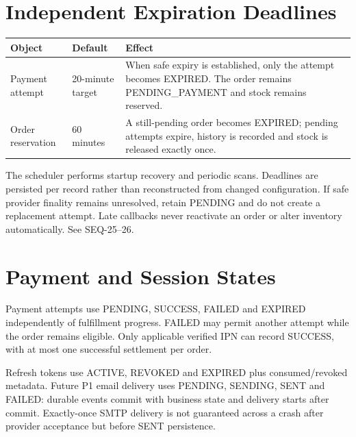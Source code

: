\section{Independent Expiration Deadlines}
\begin{tabularx}{\textwidth}{@{}p{37mm}p{26mm}X@{}}
\toprule
Object & Default & Effect \\
\midrule
Payment attempt & 20-minute target & When safe expiry is established, only the attempt becomes EXPIRED. The order remains PENDING\_PAYMENT and stock remains reserved. \\
Order reservation & 60 minutes & A still-pending order becomes EXPIRED; pending attempts expire, history is recorded and stock is released exactly once. \\
\bottomrule
\end{tabularx}

The scheduler performs startup recovery and periodic scans. Deadlines are persisted per record rather than reconstructed from changed configuration. If safe provider finality remains unresolved, retain PENDING and do not create a replacement attempt. Late callbacks never reactivate an order or alter inventory automatically. See SEQ-25--26.

\section{Payment and Session States}
Payment attempts use PENDING, SUCCESS, FAILED and EXPIRED independently of fulfillment progress. FAILED may permit another attempt while the order remains eligible. Only applicable verified IPN can record SUCCESS, with at most one successful settlement per order.

Refresh tokens use ACTIVE, REVOKED and EXPIRED plus consumed/revoked metadata. Future P1 email delivery uses PENDING, SENDING, SENT and FAILED: durable events commit with business state and delivery starts after commit. Exactly-once SMTP delivery is not guaranteed across a crash after provider acceptance but before SENT persistence.
